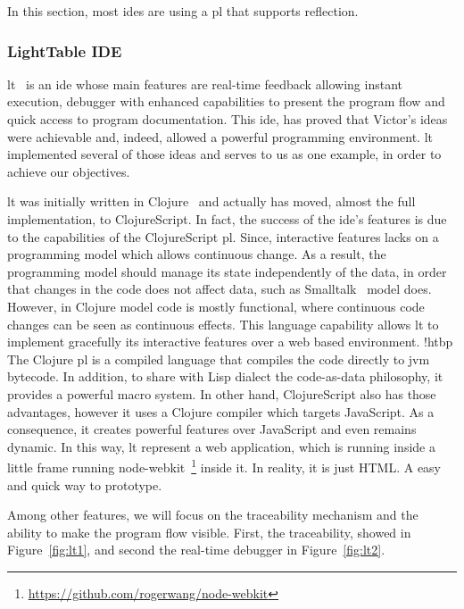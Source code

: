 In this section, most \ac{ide}s are using a \ac{pl} that supports reflection.

\subsubsection{LightTable IDE}
\label{sec:lt}

\ac{lt}~\cite{lighttable} is an \ac{ide} whose main features are real-time feedback allowing instant execution, debugger with enhanced capabilities to present the program flow and quick access to program documentation. This \ac{ide}, has proved that Victor's ideas~\cite{inventingPrin,learnableProg} were achievable and, indeed, allowed a powerful programming environment. \ac{lt} implemented several of those ideas and serves to us as one example, in order to achieve our objectives.

\ac{lt} was initially written in Clojure~\cite{hickey2008clojure} and actually has moved, almost the full implementation, to ClojureScript. In fact, the success of the \ac{ide}'s features is due to the capabilities of the ClojureScript \ac{pl}. Since, interactive features lacks on a programming model which allows continuous change. As a result, the programming model should manage its state independently of the data, in order that changes in the code does not affect data, such as Smalltalk~\cite{goldberg1983smalltalk} model does. However, in Clojure model code is mostly functional, where continuous code changes can be seen as continuous effects. This language capability allows \ac{lt} to implement gracefully its interactive features over a web based environment.
!htbp
The Clojure \ac{pl} is a compiled language that compiles the code directly to \ac{jvm} bytecode. In addition, to share with Lisp dialect the code-as-data philosophy, it provides a powerful macro system. In other hand, ClojureScript also has those advantages, however it uses a Clojure compiler which targets JavaScript. As a consequence, it creates powerful features over JavaScript and even remains dynamic. In this way, \ac{lt} represent a web application, which is running inside a little frame running node-webkit~\footnote{\url{https://github.com/rogerwang/node-webkit}} inside it. In reality, it is just {\small HTML}. A easy and quick way to prototype.

Among other features, we will focus on the traceability mechanism and the ability to make the program flow visible. First, the traceability, showed in Figure~\ref{fig:lt1}, and second the real-time debugger in Figure~\ref{fig:lt2}.

